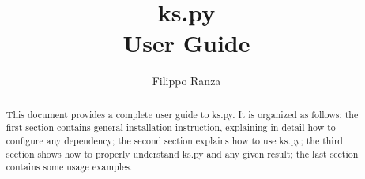 \documentclass[12pt,a4paper]{article}
\title{ks.py\\
\large User Guide}
\author{Filippo Ranza}
\date{}
\begin{document}
    \maketitle
    \begin{abstract}
        This document provides a complete user guide to ks.py. It 
        is organized as follows: the first section contains general installation 
        instruction, explaining in detail how to configure any dependency; the second
        section explains how to use ks.py; the third section shows how to properly understand
        ks.py and any given result; the last section contains some usage examples.
    \end{abstract}

    \tableofcontents
 
    
    
    
\end{document}
